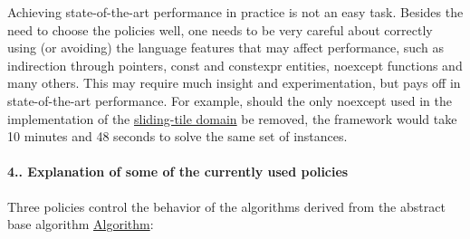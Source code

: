 Achieving state-\/of-\/the-\/art performance in practice is not an easy task. Besides the need to choose the policies well, one needs to be very careful about correctly using (or avoiding) the language features that may affect performance, such as indirection through pointers, {\ttfamily const} and {\ttfamily constexpr} entities, {\ttfamily noexcept} functions and many others. This may require much insight and experimentation, but pays off in state-\/of-\/the-\/art performance. For example, should the only {\ttfamily noexcept} used in the implementation of the \hyperlink{sliding__tile_8h}{sliding-\/tile domain} be removed, the framework would take 10 minutes and 48 seconds to solve the same set of instances.\hypertarget{index_s-current-policies}{}\paragraph{4.. Explanation of some of the currently used policies}\label{index_s-current-policies}
Three policies control the behavior of the algorithms derived from the abstract base algorithm \hyperlink{structslb_1_1ext_1_1algorithm_1_1Algorithm}{Algorithm}\+:
